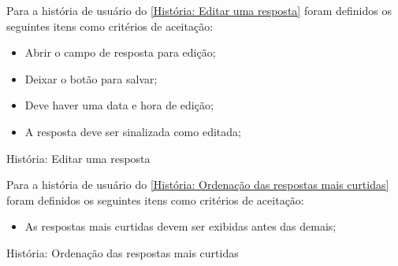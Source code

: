 Para a história de usuário do \autoref{História: Editar uma resposta} foram definidos os seguintes itens como critérios de aceitação:

\begin{itemize}
\item Abrir o campo de resposta para edição;
\item Deixar o botão para salvar;
\item Deve haver uma data e hora de edição;
\item A resposta deve ser sinalizada como editada;
\end{itemize}

\def\arraystretch{2}
\begin{quadro}[htb]
\centering
\ABNTEXfontereduzida
\caption[História: Editar uma resposta]{História: Editar uma resposta}
\label{História: Editar uma resposta}
\end{quadro}
\FloatBarrier 

Para a história de usuário do \autoref{História: Ordenação das respostas mais curtidas} foram definidos os seguintes itens como critérios de aceitação:

\begin{itemize}
\item As respostas mais curtidas devem ser exibidas antes das demais;
\end{itemize}

\def\arraystretch{2}
\begin{quadro}[htb]
\centering
\ABNTEXfontereduzida
\caption[História: Ordenação das respostas mais curtidas]{História: Ordenação das respostas mais curtidas}
\label{História: Ordenação das respostas mais curtidas}
\end{quadro}
\FloatBarrier 


